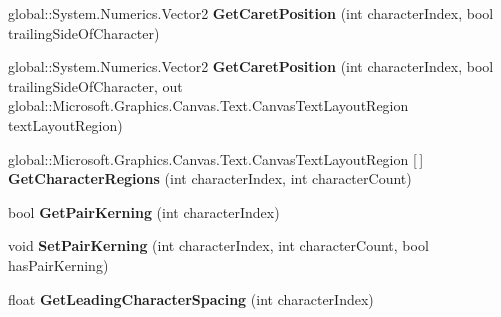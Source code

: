 \begin{DoxyCompactItemize}
\mbox{\label{class_microsoft_1_1_graphics_1_1_canvas_1_1_text_1_1_canvas_text_layout_ad61d630b4143924a996579c3c14e39bd}} 
global\+::\+System.\+Numerics.\+Vector2 {\bfseries Get\+Caret\+Position} (int character\+Index, bool trailing\+Side\+Of\+Character)
\item 
\mbox{\label{class_microsoft_1_1_graphics_1_1_canvas_1_1_text_1_1_canvas_text_layout_a570264c3b7269effae081d1e5a88df05}} 
global\+::\+System.\+Numerics.\+Vector2 {\bfseries Get\+Caret\+Position} (int character\+Index, bool trailing\+Side\+Of\+Character, out global\+::\+Microsoft.\+Graphics.\+Canvas.\+Text.\+Canvas\+Text\+Layout\+Region text\+Layout\+Region)
\item 
\mbox{\label{class_microsoft_1_1_graphics_1_1_canvas_1_1_text_1_1_canvas_text_layout_a7a2da41d929849793b28b02d8754c790}} 
global\+::\+Microsoft.\+Graphics.\+Canvas.\+Text.\+Canvas\+Text\+Layout\+Region \mbox{[}$\,$\mbox{]} {\bfseries Get\+Character\+Regions} (int character\+Index, int character\+Count)
\item 
\mbox{\label{class_microsoft_1_1_graphics_1_1_canvas_1_1_text_1_1_canvas_text_layout_add821cfda40c6e413e94792d52f961f5}} 
bool {\bfseries Get\+Pair\+Kerning} (int character\+Index)
\item 
\mbox{\label{class_microsoft_1_1_graphics_1_1_canvas_1_1_text_1_1_canvas_text_layout_ac079598c499d635ad51a5e304c41da93}} 
void {\bfseries Set\+Pair\+Kerning} (int character\+Index, int character\+Count, bool has\+Pair\+Kerning)
\item 
\mbox{\label{class_microsoft_1_1_graphics_1_1_canvas_1_1_text_1_1_canvas_text_layout_a65d05d925378e8e2514390271630066c}} 
float {\bfseries Get\+Leading\+Character\+Spacing} (int character\+Index)
\item 
\mbox{\label{class_microsoft_1_1_graphics_1_1_canvas_1_1_text_1_1_canvas_text_layout_a70acd1bd088fdd6ab75e719f500f7d5c}} 

\end{DoxyCompactItemize}
